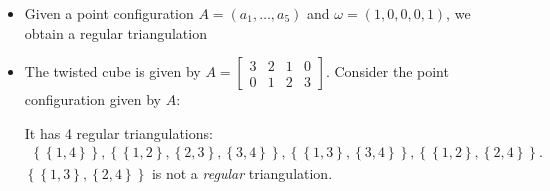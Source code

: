 \documentclass[a4paper, 11pt]{article}
\begin{document}
\begin{eg}
\begin{itemize}
    \item Given a point configuration \( A = (a_1, \dots, a_5) \) and \( \omega = (1, 0,0,0, 1) \), we obtain a regular triangulation  
    \begin{figure}[H]
      \centering
    \end{figure}

    \item The twisted cube is given by \( A = \begin{bmatrix}
      3 & 2 & 1 & 0 \\ 0 & 1 & 2& 3
    \end{bmatrix} \). Consider the point configuration given by \( A \):
    \begin{figure}[H]
      \centering
    \end{figure}
    It has 4 regular triangulations: 
    \begin{align*}
      \left\{ \left\{ 1,4 \right\} \right\}, \left\{  \left\{ 1,2 \right\}, \left\{ 2,3 \right\}, \left\{ 3,4 \right\}\right\}, \left\{ \left\{ 1,3 \right\}, \left\{ 3,4 \right\} \right\}, \left\{ \left\{ 1,2 \right\}, \left\{ 2,4 \right\} \right\} .
    \end{align*}
    \( \left\{ \left\{ 1,3 \right\}, \left\{ 2,4 \right\} \right\} \) is not a \emph{regular} triangulation.
  \end{itemize}
\end{eg}

\end{document}
